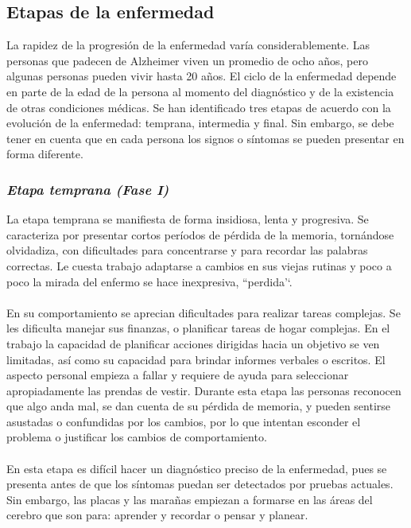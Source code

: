 \documentclass[smallextended, 12pt]{article}
\begin{document}
	\subsection{Etapas de la enfermedad}
	La rapidez de la progresi\'on de la enfermedad var\'ia considerablemente. Las personas que padecen de Alzheimer viven un promedio de ocho a\~nos, pero algunas personas pueden vivir hasta 20 a\~nos. El ciclo de la enfermedad depende en parte de la edad de la persona al momento del diagn\'ostico y de la existencia de otras condiciones m\'edicas. Se han identificado tres etapas de acuerdo con la evoluci\'on de la enfermedad: temprana, intermedia y final. Sin embargo, se debe tener en cuenta que en cada persona los signos o s\'intomas se pueden presentar en forma diferente. \cite{ref3} \cite{ref8}
	
	\subsubsection{\textit{Etapa temprana (Fase I)}}
	La etapa temprana se manifiesta de forma insidiosa, lenta y progresiva. Se caracteriza por presentar cortos per\'iodos de p\'erdida de la memoria, torn\'andose olvidadiza, con dificultades para concentrarse y para recordar las palabras correctas. Le cuesta trabajo adaptarse a cambios en sus viejas rutinas y poco a poco la mirada del enfermo se hace inexpresiva, ``perdida'‘. \cite{ref3} \cite{ref8} \\
	\\
	En su comportamiento se aprecian dificultades para realizar tareas complejas. Se les dificulta manejar sus finanzas, o planificar tareas de hogar complejas. En el trabajo la capacidad de planificar acciones dirigidas hacia un objetivo se ven limitadas, as\'i como su capacidad para brindar informes verbales o escritos. El aspecto personal empieza a fallar y requiere de ayuda para seleccionar apropiadamente las prendas de vestir. Durante esta etapa las personas reconocen que algo anda mal, se dan cuenta de su p\'erdida de memoria, y pueden sentirse asustadas o confundidas por los cambios, por lo que intentan esconder el problema o justificar los cambios de comportamiento. \cite{ref8}\\
	\\
	En esta etapa es dif\'icil hacer un diagn\'ostico preciso de la enfermedad, pues se presenta antes de que los s\'intomas puedan ser detectados por pruebas actuales. Sin embargo, las placas y las mara\~nas empiezan a formarse en las \'areas del cerebro que son para: aprender y recordar o pensar y planear. \cite{ref3} \cite{ref8}
	
\end{document}
